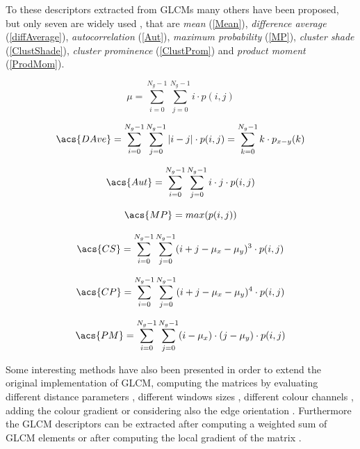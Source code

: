\documentclass[final,a4paper,12pt,english]{UnicaPhdThesis3}
\begin{document}
	To these descriptors extracted from GLCMs many others have been proposed, but only seven are widely used \cite{Soh, Clausi}, that are \textit{mean} (\ref {Mean}), \textit{difference average} (\ref{diffAverage}), \textit{autocorrelation} (\ref{Aut}), \textit{maximum probability} (\ref{MP}), \textit{cluster shade} (\ref{ClustShade}),  \textit{cluster prominence} (\ref {ClustProm}) and \textit{product moment} (\ref {ProdMom}). 
	
	\begin{equation}\label{Mean}
	{\mu}=\sum_{i=0}^{N_{g}-1}\sum_{j=0}^{N_{g}-1} i \cdot p(i,j)
	\end{equation}
	
	\begin{equation}\label{diffAverage}
	\acs{DAve}= \sum_{i=0}^{N_{g}-1}\sum_{j=0}^{N_{g}-1}  |i-j| \cdot p(i,j) = \sum_{k=0}^{N_{g}-1} k \cdot p_{x-y}(k)
	\end{equation}
	
	\begin{equation}\label{Aut}
	\acs{Aut}=\sum_{i=0}^{N_{g}-1}\sum_{j=0}^{N_{g}-1} i \cdot j \cdot p(i,j)
	\end{equation}
	
	\begin{equation}\label{MP}
	\acs{MP}=max(p(i,j))
	\end{equation}
	
	\begin{equation}\label{ClustShade}
	\acs{CS}=\sum_{i=0}^{N_{g}-1}\sum_{j=0}^{N_{g}-1}  (i + j - \mu_x - \mu_y)^3 \cdot p(i,j)
	\end{equation}
	
	\begin{equation}\label{ClustProm}
	\acs{CP}=\sum_{i=0}^{N_{g}-1}\sum_{j=0}^{N_{g}-1}  (i + j - \mu_x - \mu_y)^4 \cdot p(i,j)
	\end{equation}
	
	\begin{equation}\label{ProdMom}
	\acs{PM}=\sum_{i=0}^{N_{g}-1}\sum_{j=0}^{N_{g}-1}  (i - \mu_x) \cdot (j - \mu_y) \cdot p(i,j)
	\end{equation}
	
	Some interesting methods have also been presented in order to extend the original implementation of GLCM, computing the matrices by evaluating different distance parameters \cite{Gelz}, different windows sizes \cite{HuY}, different colour channels \cite{Benco}, adding the colour gradient \cite{Gong} or considering also the edge orientation \cite{Mitrea}. Furthermore the GLCM descriptors can be extracted after computing a weighted sum of GLCM elements \cite{Walker} or after computing the local gradient of the matrix \cite{Chen}. 
	
\end{document}
